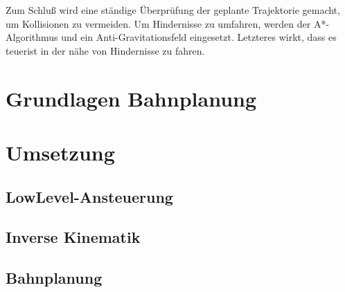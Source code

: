 Zum Schluß wird eine ständige Überprüfung der geplante Trajektorie gemacht, um Kollisionen zu vermeiden.
Um Hindernisse zu umfahren, werden der A*-Algorithmus und ein Anti-Gravitationsfeld eingesetzt.
Letzteres wirkt, dass es \glqq teuer\grqq \space ist in der nähe von Hindernisse zu fahren.



\section{Grundlagen Bahnplanung}
\label{bahnplanung_grundlagen_sec}
\authorsection{\editoroier}



\section{Umsetzung}
\label{bahnplanung_umsetzung_sec}


\subsection{LowLevel-Ansteuerung}
\label{bahnplanung_lowlevel_subsec}
\authorsection{\editoroier}




\subsection{Inverse Kinematik}
\label{inverse_kinematik_subsec}
\authorsection{\editorjulian}



\subsection{Bahnplanung}
\label{bahnplanung_subsec}
\authorsection{\editortobias}


